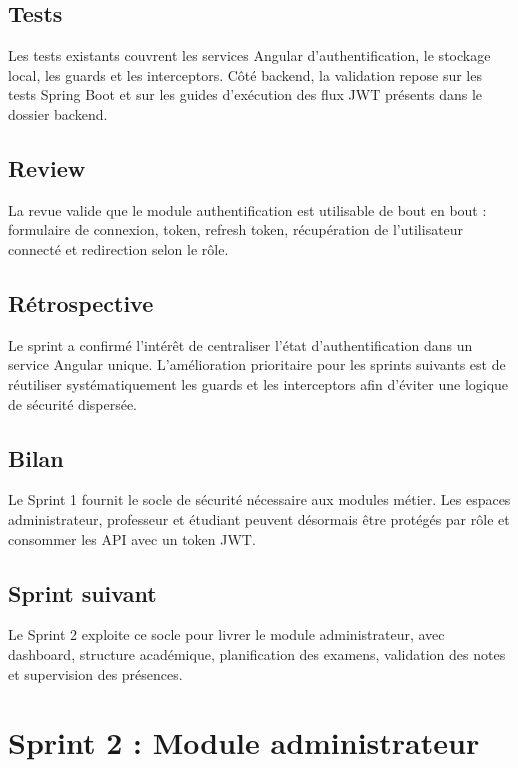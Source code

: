 \documentclass[12pt,a4paper]{report}
\begin{document}
\section{Tests}

Les tests existants couvrent les services Angular d'authentification, le stockage local, les guards et les interceptors. Côté backend, la validation repose sur les tests Spring Boot et sur les guides d'exécution des flux JWT présents dans le dossier backend.

\section{Review}

La revue valide que le module authentification est utilisable de bout en bout : formulaire de connexion, token, refresh token, récupération de l'utilisateur connecté et redirection selon le rôle.

\section{Rétrospective}

Le sprint a confirmé l'intérêt de centraliser l'état d'authentification dans un service Angular unique. L'amélioration prioritaire pour les sprints suivants est de réutiliser systématiquement les guards et les interceptors afin d'éviter une logique de sécurité dispersée.

\section{Bilan}

Le Sprint 1 fournit le socle de sécurité nécessaire aux modules métier. Les espaces administrateur, professeur et étudiant peuvent désormais être protégés par rôle et consommer les API avec un token JWT.

\section{Sprint suivant}

Le Sprint 2 exploite ce socle pour livrer le module administrateur, avec dashboard, structure académique, planification des examens, validation des notes et supervision des présences.

\chapter{Sprint 2 : Module administrateur}
\end{document}

